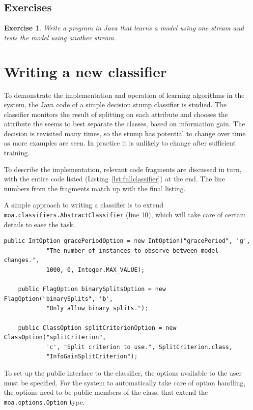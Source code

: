 \documentclass[a4paper,12pt]{article}
\newtheorem{exercise}{Exercise}{}
\begin{document}
\subsection{Exercises}
\begin{exercise}
Write a program in Java that learns a model using one stream and tests the model using another stream. 
\end{exercise}


\section{Writing a new classifier}

To demonstrate the implementation and operation of learning algorithms in the system, the Java code of a simple decision stump classifier is studied. The classifier monitors the result of splitting on each attribute and chooses the attribute the seems to best separate the classes, based on information gain. The decision is revisited many times, so the stump has potential to change over time as more examples are seen. In practice it is unlikely to change after sufficient training.

To describe the implementation, relevant code fragments are discussed in turn, with the entire code listed (Listing~\ref{lst:fullclassifier}) at the end. The line numbers from the fragments match up with the final listing.

A simple approach to writing a classifier is to extend  \\ \verb+moa.classifiers.AbstractClassifier+ (line 10), which will take care of certain details to ease the task.
\newpage
\begin{lstlisting}[caption={Option handling},label=lst:opthandle,firstnumber=14]
	public IntOption gracePeriodOption = new IntOption("gracePeriod", 'g',
			"The number of instances to observe between model changes.",
			1000, 0, Integer.MAX_VALUE);

	public FlagOption binarySplitsOption = new FlagOption("binarySplits", 'b',
			"Only allow binary splits.");

	public ClassOption splitCriterionOption = new ClassOption("splitCriterion",
			'c', "Split criterion to use.", SplitCriterion.class,
			"InfoGainSplitCriterion");
\end{lstlisting}

To set up the public interface to the classifier, the options available to the user must be specified. For the system to automatically take care of option handling, the options need to be public members of the class, that extend the \verb+moa.options.Option+ type.
\end{document}
